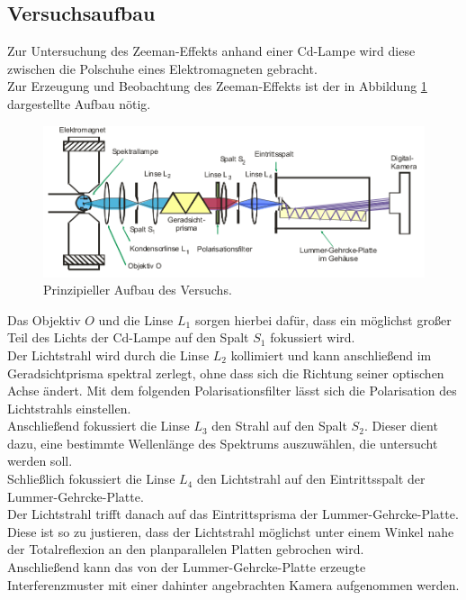 \subsection{Versuchsaufbau}
\label{sec:Versuchsaufbau}
Zur Untersuchung des Zeeman-Effekts anhand einer Cd-Lampe wird
diese zwischen die Polschuhe eines Elektromagneten gebracht.\\
Zur Erzeugung und Beobachtung des Zeeman-Effekts ist der in Abbildung \ref{fig:aufbau} dargestellte Aufbau nötig.

\begin{figure}
  \centering
  \includegraphics[width=0.98\columnwidth]{pictures/aufbau.png}
  \caption{Prinzipieller Aufbau des Versuchs.\cite{Anleitung}}
  \label{fig:aufbau}
\end{figure}
Das Objektiv $O$ und die Linse $L_1$ sorgen hierbei dafür, dass ein möglichst großer Teil des Lichts der Cd-Lampe auf den Spalt $S_1$ fokussiert wird.\\
Der Lichtstrahl wird durch die Linse $L_2$ kollimiert und kann anschließend im Geradsichtprisma spektral zerlegt, ohne dass sich die Richtung seiner optischen Achse ändert.
Mit dem folgenden Polarisationsfilter lässt sich die Polarisation des Lichtstrahls einstellen. \\
Anschließend fokussiert die Linse $L_3$ den Strahl auf den Spalt $S_2$. Dieser dient dazu, eine bestimmte Wellenlänge des Spektrums auszuwählen, die untersucht werden soll.\\ Schließlich fokussiert die Linse $L_4$ den Lichtstrahl auf den Eintrittsspalt der Lummer-Gehrcke-Platte.\\
Der Lichtstrahl trifft danach auf das Eintrittsprisma der Lummer-Gehrcke-Platte. Diese ist so zu justieren, dass der Lichtstrahl möglichst unter einem Winkel nahe der Totalreflexion an den planparallelen Platten gebrochen wird. \\
Anschließend kann
das von der Lummer-Gehrcke-Platte erzeugte
Interferenzmuster mit einer dahinter angebrachten Kamera aufgenommen werden.
